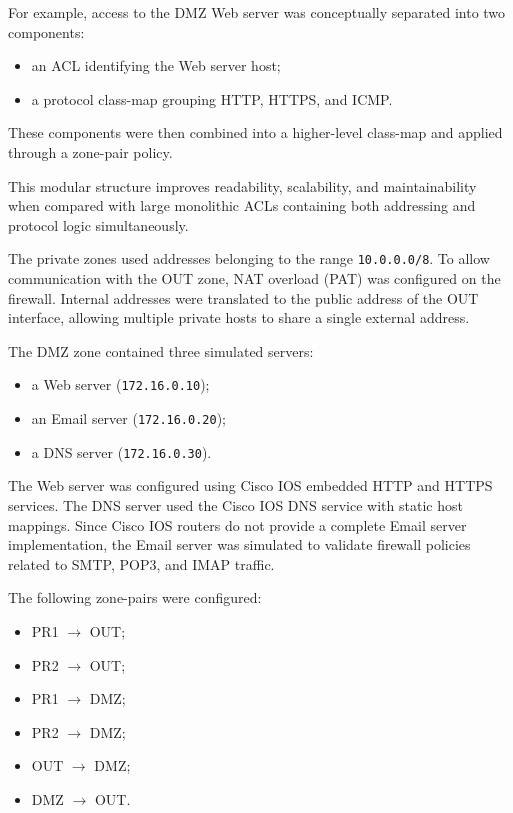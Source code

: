 \documentclass[12pt]{article}
\begin{document}
For example, access to the DMZ Web server was conceptually separated into two components:
\begin{itemize}
    \item an ACL identifying the Web server host;
    \item a protocol class-map grouping HTTP, HTTPS, and ICMP.
\end{itemize}

These components were then combined into a higher-level class-map and applied through a zone-pair policy.

This modular structure improves readability, scalability, and maintainability when compared with large monolithic ACLs containing both addressing and protocol logic simultaneously.

The private zones used addresses belonging to the range \texttt{10.0.0.0/8}. To allow communication with the OUT zone, NAT overload (PAT) was configured on the firewall. Internal addresses were translated to the public address of the OUT interface, allowing multiple private hosts to share a single external address.

The DMZ zone contained three simulated servers:
\begin{itemize}
    \item a Web server (\texttt{172.16.0.10});
    \item an Email server (\texttt{172.16.0.20});
    \item a DNS server (\texttt{172.16.0.30}).
\end{itemize}

The Web server was configured using Cisco IOS embedded HTTP and HTTPS services. The DNS server used the Cisco IOS DNS service with static host mappings. Since Cisco IOS routers do not provide a complete Email server implementation, the Email server was simulated to validate firewall policies related to SMTP, POP3, and IMAP traffic.

The following zone-pairs were configured:
\begin{itemize}
    \item PR1 $\rightarrow$ OUT;
    \item PR2 $\rightarrow$ OUT;
    \item PR1 $\rightarrow$ DMZ;
    \item PR2 $\rightarrow$ DMZ;
    \item OUT $\rightarrow$ DMZ;
    \item DMZ $\rightarrow$ OUT.
\end{itemize}
\end{document}
